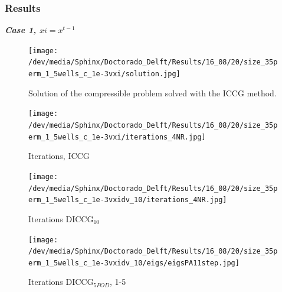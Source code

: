 \documentclass{beamer}
\begin{document}
\begin{frame}[shrink=5]
\frametitle{Results}
\emph{\Large \textbf{Case 1, $xi=x^{t-1}$}}\\
\begin{figure}[!h]
\centering 
\begin{minipage}{.45\textwidth}
 \centering
\texttt{[image: /dev/media/Sphinx/Doctorado\_Delft/Results/16\_08/20/size\_35perm\_1\_5wells\_c\_1e-3vxi/solution.jpg]}
\caption{Solution of the compressible problem solved with the ICCG method.}
\label{fig:compsol}
\end{minipage}%
\hspace{10mm}
\begin{minipage}{.45\textwidth}
 \centering
\texttt{[image: /dev/media/Sphinx/Doctorado\_Delft/Results/16\_08/20/size\_35perm\_1\_5wells\_c\_1e-3vxi/iterations\_4NR.jpg]}
\caption{Iterations, ICCG}
\label{fig:NR_IC}
\end{minipage}
\end{figure}
\begin{figure}[!h]
\centering
\begin{minipage}{.4\textwidth}
 \centering
\texttt{[image: /dev/media/Sphinx/Doctorado\_Delft/Results/16\_08/20/size\_35perm\_1\_5wells\_c\_1e-3vxidv\_10/iterations\_4NR.jpg]}
\caption{Iterations DICCG$_{10}$}
\label{fig:NR_D10}
\end{minipage}%
\hspace{15mm}
\begin{minipage}{.4\textwidth}
 \centering
\texttt{[image: /dev/media/Sphinx/Doctorado\_Delft/Results/16\_08/20/size\_35perm\_1\_5wells\_c\_1e-3vxidv\_10/eigs/eigsPA11step.jpg]}
\caption{Iterations DICCG$_{5POD}$, 1-5}
\label{fig:NR_POD5}
\end{minipage}
\end{figure}
\end{frame}
\end{document}
